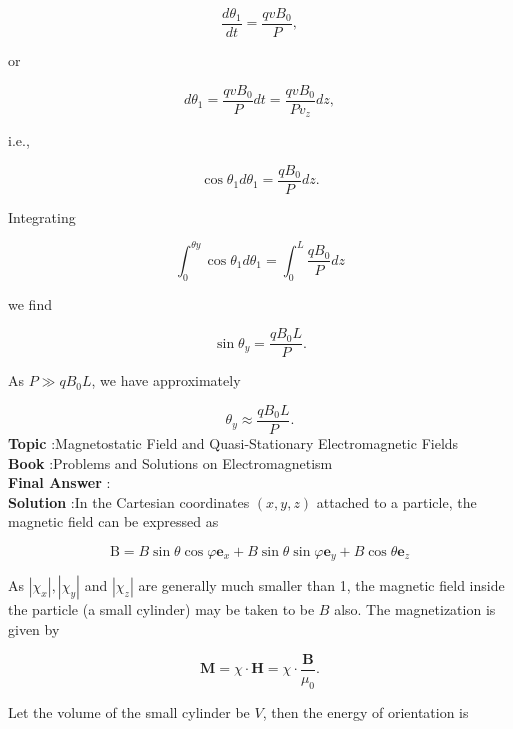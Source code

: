 \documentclass[10pt]{article}
\begin{document}
$$
\frac{d \theta_{1}}{d t}=\frac{q v B_{0}}{P},
$$

or

$$
d \theta_{1}=\frac{q v B_{0}}{P} d t=\frac{q v B_{0}}{P v_{z}} d z,
$$

i.e.,

$$
\cos \theta_{1} d \theta_{1}=\frac{q B_{0}}{P} d z .
$$

Integrating

$$
\int_{0}^{\theta y} \cos \theta_{1} d \theta_{1}=\int_{0}^{L} \frac{q B_{0}}{P} d z
$$

we find

$$
\sin \theta_{y}=\frac{q B_{0} L}{P} .
$$

As $P \gg q B_{0} L$, we have approximately

$$
\theta_{y} \approx \frac{q B_{0} L}{P} .
$$
\textbf{Topic} :Magnetostatic Field and Quasi-Stationary Electromagnetic Fields\\
\textbf{Book} :Problems and Solutions on Electromagnetism\\
\textbf{Final Answer} :\\


\textbf{Solution} :In the Cartesian coordinates $(x, y, z)$ attached to a particle, the magnetic field can be expressed as

$$
\mathrm{B}=B \sin \theta \cos \varphi \mathbf{e}_{x}+B \sin \theta \sin \varphi \mathbf{e}_{y}+B \cos \theta \mathbf{e}_{z}
$$

As $\left|\chi_{x}\right|,\left|\chi_{y}\right|$ and $\left|\chi_{z}\right|$ are generally much smaller than 1, the magnetic field inside the particle (a small cylinder) may be taken to be $B$ also. The magnetization is given by

$$
\mathbf{M}=\chi \cdot \mathbf{H}=\chi \cdot \frac{\mathbf{B}}{\mu_{0}} .
$$

Let the volume of the small cylinder be $V$, then the energy of orientation is
\end{document}
